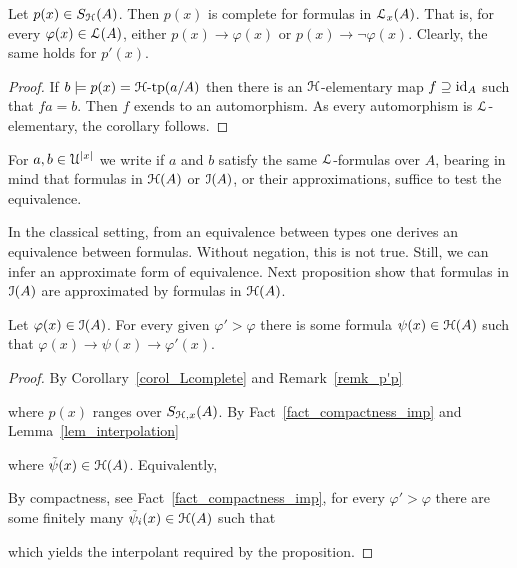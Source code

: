 \documentclass[10pt,oneside]{amsproc}
\renewcommand*{\emph}[1]{%
   \smash{\tikz[baseline]\node[rectangle, fill=teal!25, rounded corners, inner xsep=0.5ex, inner ysep=0.2ex, anchor=base, minimum height = 2.7ex]{\strut #1};}}
\begin{document}
\begin{corollary}\label{corol_Lcomplete}
  Let $p(x)\in S_{\EuScript H}(A)$.
  Then $p(x)$ is complete for formulas in ${\EuScript L}_x(A)$.
  That is, for every $\varphi(x)\in{\EuScript L}(A)$, either $p(x)\rightarrow\varphi(x)$ or $p(x)\rightarrow\neg\varphi(x)$.
  Clearly, the same holds for $p'(x)$.
\end{corollary}

\begin{proof}
  If $b\models p(x)={\EuScript H}\mbox{-tp}(a/A)$ then there is an ${\EuScript H}$-elementary map $f\supseteq{\rm id}_A$ such that $fa=b$.
  Then $f$ exends to an automorphism.
  As every automorphism is ${\EuScript L}$-elementary, the corollary follows.
\end{proof}

For $a,b\in {\EuScript U}^{|x|}$ we write \emph{$a\equiv_Ab$\/} if $a$ and $b$ satisfy the same ${\EuScript L}$-formulas over $A$, bearing in mind that formulas in ${\EuScript H}(A)$ or ${\EuScript I}(A)$, or their approximations, suffice to test the equivalence.

In the classical setting, from an equivalence between types one derives an  equivalence between formulas.
Without negation, this is not true.
Still, we can infer an approximate form of equivalence.
Next proposition show that formulas in ${\EuScript I}(A)$ are approximated by formulas in ${\EuScript H}(A)$.

\begin{proposition}\label{prop_LHapprox1}
  Let $\varphi(x)\in{\EuScript I}(A)$.
  For every given $\varphi'>\varphi$ there is some formula $\psi(x)\in{\EuScript H}(A)$ such that $\varphi(x)\rightarrow\psi(x)\rightarrow\varphi'(x)$.
\end{proposition}

\begin{proof}
  By Corollary~\ref{corol_Lcomplete} and Remark~\ref{remk_p'p}


  where $p(x)$ ranges over $S_{{\EuScript H},x}(A)$.
  By Fact~\ref{fact_compactness_imp} and Lemma~\ref{lem_interpolation}


  where $\tilde{\psi}(x)\in{\EuScript H}(A)$.
  Equivalently,


  By compactness, see Fact~\ref{fact_compactness_imp}, for every $\varphi'>\varphi$ there are some finitely many $\tilde{\psi}_i(x)\in{\EuScript H}(A)$ such that


  which yields the interpolant required by the proposition.
\end{proof}
\end{document}
